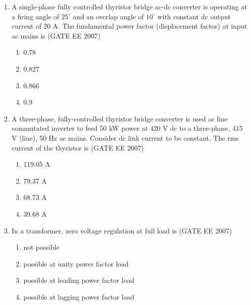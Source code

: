 \documentclass[a4paper,10pt]{exam}
\theoremstyle{remark}
\begin{document}
\begin{enumerate}
\begin{multicols}{2}
\begin{enumerate}
\item has rank zero
\item has rank 1
\item is orthogonal
\item has rank n
\end{enumerate}
\end{multicols}

\noindent
\item  \quad A single-phase fully controlled thyristor bridge ac-dc converter is operating at a firing angle of $25^\circ$ and an overlap angle of $10^\circ$ with constant dc output current of 20 A. The fundamental power factor (displacement factor) at input ac mains is \hfill{(GATE EE 2007)} 

\begin{multicols}{2}
\begin{enumerate}
 \item    0.78
\item  0.827
\item 0.866
\item  0.9
\end{enumerate}
\end{multicols}

\newpage

\item A three-phase, fully-controlled thyristor bridge converter is used as line commutated inverter to feed 50 kW power at 420 V dc to a three-phase, 415 V (line), 50 Hz ac mains. Consider dc link current to be constant. The rms current of the thyristor is \hfill{(GATE EE 2007)} 

\begin{multicols}{4}
\begin{enumerate}
 \item 119.05 A
\item  79.37 A
\item 68.73 A 
\item  39.68 A
\end{enumerate}
\end{multicols}

\item  In a transformer, zero voltage regulation at full load is \hfill{(GATE EE 2007)} 

\begin{multicols}{4}
\begin{enumerate}
 \item  not possible
\item   possible at unity power factor load 
\item  possible at leading power factor load 
\item  possible at lagging power factor load
\end{enumerate}
\end{multicols}


\end{enumerate}
\end{document}
